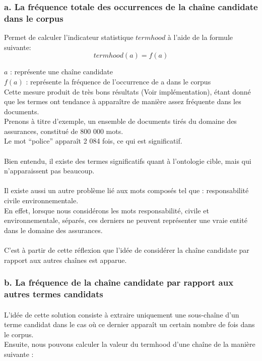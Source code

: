 \documentclass[12pt, a4paper, oneside]{book}
\begin{document}
\subsubsection{a. La fréquence totale des occurrences de la chaîne candidate dans le corpus}

Permet de calculer l'indicateur statistique $termhood$ à l'aide de la formule suivante:
\begin{equation}
termhood(a) = f(a)
\end{equation}

$a$ : représente une chaîne candidate\\
$f(a)$ : représente la fréquence de l'occurrence de a dans le corpus\\

Cette mesure produit de très bons résultats (Voir implémentation), étant donné que les termes ont tendance à apparaître de manière assez fréquente dans les documents.\\
Prenons à titre d'exemple, un ensemble de documents tirés du domaine des assurances, constitué de 800 000 mots.\\ Le mot “police” apparaît 2 084 fois, ce qui est significatif.
\paragraph{}
Bien entendu, il existe des termes significatifs quant à l'ontologie cible, mais qui n'apparaissent pas beaucoup.
\paragraph{}
Il existe aussi un autre problème lié aux mots composés tel que : responsabilité civile environnementale.\\
En effet, lorsque nous considérons les mots responsabilité, civile et environnementale, séparés, ces derniers ne peuvent représenter une vraie entité dans le domaine des assurances.
\paragraph{}
C'est à partir de cette réflexion que l'idée de considérer la chaîne candidate par rapport aux autres chaînes est apparue.

\subsubsection{b. La fréquence de la chaîne candidate par rapport aux autres termes candidats}
\paragraph{}
L'idée de cette solution consiste à extraire uniquement une sous-chaîne d'un terme candidat dans le cas où ce dernier apparaît un certain nombre de fois dans le corpus. \\
Ensuite, nous pouvons calculer la valeur du termhood d'une chaîne de la manière suivante :
\end{document}
